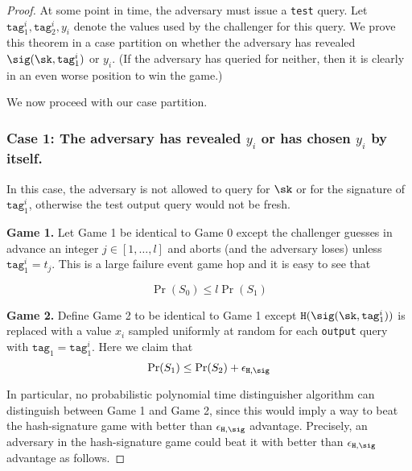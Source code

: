 \documentclass{article}
\begin{document}
{\begin{proof}
At some point in time, the adversary must issue a \texttt{test} query. Let $\texttt{tag}_1^i, \texttt{tag}_2^i, y_i$ denote the values used by the challenger for this query. We prove this theorem in a case partition on whether the adversary has revealed $\sig(\sk,\texttt{tag}_1^i)$ or $y_i$. (If the adversary has queried for neither, then it is clearly in an even worse position to win the game.) 

\noindent We now proceed with our case partition.

\subsubsection*{Case 1: The adversary has revealed $y_i$ or has chosen $y_i$ by itself.} In this case, the adversary is not allowed to query for $\sk$ or for the signature of $\texttt{tag}_1^i$, otherwise the test output query would not be fresh.

\noindent \textbf{Game 1.} Let Game 1 be identical to Game 0 except the challenger guesses in advance an integer $j \in [1, \dots, l]$ and aborts (and the adversary loses) unless $\texttt{tag}_1^i = t_j$.  This is a large failure event game hop and it is easy to see that

$$
\Pr(S_0) \le l \Pr(S_1)
$$


\noindent \textbf{Game 2.} Define Game 2 to be identical to Game 1 except $\texttt{H}(\sig(\sk, \texttt{tag}_1^i))$ is replaced with a value $x_i$ sampled uniformly at random for each  \texttt{output} query with $\texttt{tag}_1 = \texttt{tag}_1^i$. Here we claim that
$$\Pr(S_1) \le  \Pr(S_2) + \epsilon_{\texttt{H}, \sig}$$

In particular, no probabilistic polynomial time distinguisher algorithm can distinguish between Game 1 and Game 2, since this would imply a way to beat the hash-signature game with better than $\epsilon_{\texttt{H}, \sig}$ advantage. Precisely, an adversary in the hash-signature game could beat it with better than $\epsilon_{\texttt{H}, \sig}$ advantage as follows. 


\end{proof}}
\end{document}
